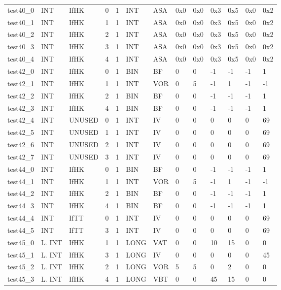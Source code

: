 \begin{longtable}{|l|l|l|p{0.5cm}|p{0.5cm}|l|p{0.5cm}|p{0.5cm}|p{0.5cm}|l|l|p{0.5cm}|l|}
test40\_0 & INT & IfHK & 0 & 1 & INT & ASA & 0x0 & 0x0 & 0x3 & 0x5 & 0x0 & 0x2 \\
test40\_1 & INT & IfHK & 1 & 1 & INT & ASA & 0x0 & 0x0 & 0x3 & 0x5 & 0x0 & 0x2 \\
test40\_2 & INT & IfHK & 2 & 1 & INT & ASA & 0x0 & 0x0 & 0x3 & 0x5 & 0x0 & 0x2 \\
test40\_3 & INT & IfHK & 3 & 1 & INT & ASA & 0x0 & 0x0 & 0x3 & 0x5 & 0x0 & 0x2 \\
test40\_4 & INT & IfHK & 4 & 1 & INT & ASA & 0x0 & 0x0 & 0x3 & 0x5 & 0x0 & 0x2 \\
test42\_0 & INT & IfHK & 0 & 1 & BIN & BF & 0 & 0 & -1 & -1 & -1 & 1 \\
test42\_1 & INT & IfHK & 1 & 1 & INT & VOR & 0 & 5 & -1 & 1 & -1 & -1 \\
test42\_2 & INT & IfHK & 2 & 1 & BIN & BF & 0 & 0 & -1 & -1 & -1 & 1 \\
test42\_3 & INT & IfHK & 4 & 1 & BIN & BF & 0 & 0 & -1 & -1 & -1 & 1 \\
test42\_4 & INT & UNUSED & 0 & 1 & INT & IV & 0 & 0 & 0 & 0 & 0 & 69 \\
test42\_5 & INT & UNUSED & 1 & 1 & INT & IV & 0 & 0 & 0 & 0 & 0 & 69 \\
test42\_6 & INT & UNUSED & 2 & 1 & INT & IV & 0 & 0 & 0 & 0 & 0 & 69 \\
test42\_7 & INT & UNUSED & 3 & 1 & INT & IV & 0 & 0 & 0 & 0 & 0 & 69 \\
test44\_0 & INT & IfHK & 0 & 1 & BIN & BF & 0 & 0 & -1 & -1 & -1 & 1 \\
test44\_1 & INT & IfHK & 1 & 1 & INT & VOR & 0 & 5 & -1 & 1 & -1 & -1 \\
test44\_2 & INT & IfHK & 2 & 1 & BIN & BF & 0 & 0 & -1 & -1 & -1 & 1 \\
test44\_3 & INT & IfHK & 4 & 1 & BIN & BF & 0 & 0 & -1 & -1 & -1 & 1 \\
test44\_4 & INT & IfTT & 0 & 1 & INT & IV & 0 & 0 & 0 & 0 & 0 & 69 \\
test44\_5 & INT & IfTT & 3 & 1 & INT & IV & 0 & 0 & 0 & 0 & 0 & 69 \\
test45\_0 & L. INT & IfHK & 1 & 1 & LONG & VAT & 0 & 0 & 10 & 15 & 0 & 0 \\
test45\_1 & L. INT & IfHK & 3 & 1 & LONG & IV & 0 & 0 & 0 & 0 & 0 & 45 \\
test45\_2 & L. INT & IfHK & 2 & 1 & LONG & VOR & 5 & 5 & 0 & 2 & 0 & 0 \\
test45\_3 & L. INT & IfHK & 4 & 1 & LONG & VBT & 0 & 0 & 45 & 15 & 0 & 0 \\

\end{longtable}

